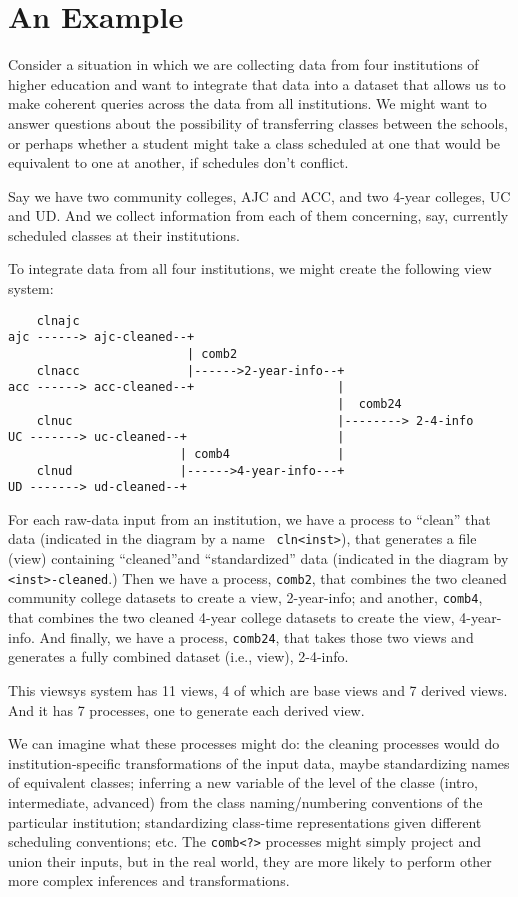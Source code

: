 \section{An Example}

Consider a situation in which we are collecting data from four
institutions of higher education and want to integrate that data into
a dataset that allows us to make coherent queries across the data from
all institutions.  We might want to answer questions about the
possibility of transferring classes between the schools, or perhaps
whether a student might take a class scheduled at one that would be
equivalent to one at another, if schedules don't conflict.

Say we have two community colleges, AJC and ACC, and two 4-year
colleges, UC and UD.  And we collect information from each of them
concerning, say, currently scheduled classes at their institutions.

To integrate data from all four institutions, we might create the
following view system:

\begin{verbatim}
    clnajc
ajc ------> ajc-cleaned--+
                         | comb2
    clnacc               |------>2-year-info--+
acc ------> acc-cleaned--+                    |
                                              |  comb24
    clnuc                                     |--------> 2-4-info
UC -------> uc-cleaned--+                     |
                        | comb4               |
    clnud               |------>4-year-info---+
UD -------> ud-cleaned--+
\end{verbatim}

For each raw-data input from an institution, we have a process to
``clean'' that data (indicated in the diagram by a name {\tt
  cln<inst>}), that generates a file (view) containing ``cleaned''and
``standardized'' data (indicated in the diagram by {\tt
  <inst>-cleaned}.)  Then we have a process, {\tt comb2}, that
combines the two cleaned community college datasets to create a view,
2-year-info; and another, {\tt comb4}, that combines the two cleaned
4-year college datasets to create the view, 4-year-info.  And finally,
we have a process, {\tt comb24}, that takes those two views and
generates a fully combined dataset (i.e., view), 2-4-info.

This viewsys system has 11 views, 4 of which are base views and 7
derived views.  And it has 7 processes, one to generate each derived
view.

We can imagine what these processes might do: the cleaning processes
would do institution-specific transformations of the input data, maybe
standardizing names of equivalent classes; inferring a new variable of
the level of the classe (intro, intermediate, advanced) from the class
naming/numbering conventions of the particular institution;
standardizing class-time representations given different scheduling
conventions; etc.  The {\tt comb<?>} processes might simply project
and union their inputs, but in the real world, they are more likely to
perform other more complex inferences and transformations.

